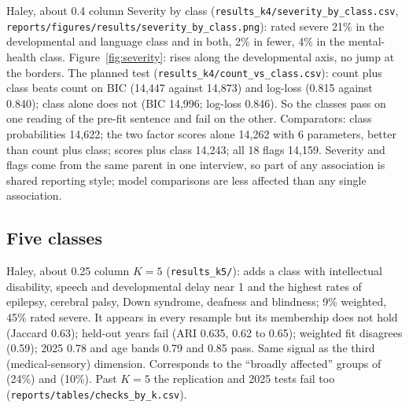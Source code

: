 \begin{stub}{Haley, about 0.4 column}
Severity by class (\texttt{results\_k4/severity\_by\_class.csv}, \texttt{reports/figures/results/severity\_by\_class.png}): rated severe 21\% in the developmental and language class and in both, 2\% in fewer, 4\% in the mental-health class. Figure~\ref{fig:severity}: rises along the developmental axis, no jump at the borders. The planned test (\texttt{results\_k4/count\_vs\_class.csv}): count plus class beats count on BIC (14,447 against 14,873) and log-loss (0.815 against 0.840); class alone does not (BIC 14,996; log-loss 0.846). So the classes pass on one reading of the pre-fit sentence and fail on the other. Comparators: class probabilities 14,622; the two factor scores alone 14,262 with 6 parameters, better than count plus class; scores plus class 14,243; all 18 flags 14,159. Severity and flags come from the same parent in one interview, so part of any association is shared reporting style; model comparisons are less affected than any single association.
\end{stub}

\subsection{Five classes}
\label{sec:k5}
\begin{stub}{Haley, about 0.25 column}
$K=5$ (\texttt{results\_k5/}): adds a class with intellectual disability, speech and developmental delay near 1 and the highest rates of epilepsy, cerebral palsy, Down syndrome, deafness and blindness; 9\% weighted, 45\% rated severe. It appears in every resample but its membership does not hold (Jaccard 0.63); held-out years fail (ARI 0.635, 0.62 to 0.65); weighted fit disagrees (0.59); 2025 0.78 and age bands 0.79 and 0.85 pass. Same signal as the third (medical-sensory) dimension. Corresponds to the ``broadly affected'' groups of \citet{vargason2019} (24\%) and \citet{litman2025} (10\%). Past $K=5$ the replication and 2025 tests fail too (\texttt{reports/tables/checks\_by\_k.csv}).
\end{stub}
